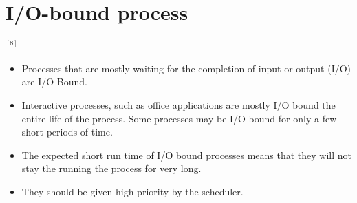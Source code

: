 \documentclass[12pt]{article}
\begin{document}
\section{I/O-bound process} $^{[8]}$

\begin{itemize}
    \item Processes that are mostly waiting for the completion of input or output (I/O) are I/O Bound.
    \item Interactive processes, such as office applications are mostly I/O bound the entire life of the process. Some processes may be I/O bound for only a few short periods of time.
    \item The expected short run time of I/O bound processes means that they will not stay the running the process for very long.
    \item They should be given high priority by the scheduler.
\end{itemize}
\end{document}
